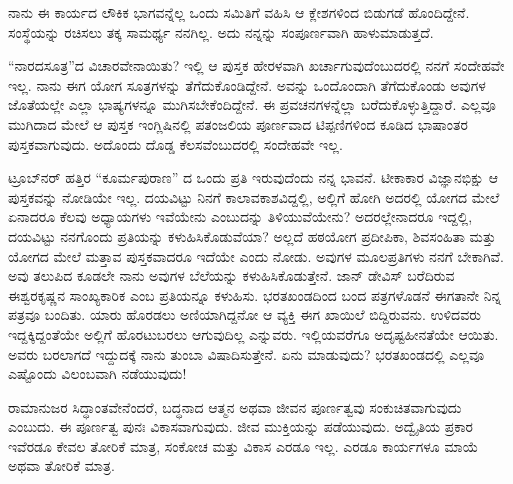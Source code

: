 ನಾನು ಈ ಕಾರ್ಯದ ಲೌಕಿಕ ಭಾಗವನ್ನೆಲ್ಲ ಒಂದು ಸಮಿತಿಗೆ ವಹಿಸಿ ಆ ಕ್ಲೇಶಗಳಿಂದ ಬಿಡುಗಡೆ ಹೊಂದಿದ್ದೇನೆ. ಸಂಸ್ಥೆಯನ್ನು ರಚಿಸಲು ತಕ್ಕ ಸಾಮರ್ಥ್ಯ ನನಗಿಲ್ಲ. ಅದು ನನ್ನನ್ನು ಸಂಪೂರ್ಣವಾಗಿ ಹಾಳುಮಾಡುತ್ತದೆ.

“ನಾರದಸೂತ್ರ”ದ ವಿಚಾರವೇನಾಯಿತು? ಇಲ್ಲಿ ಆ ಪುಸ್ತಕ ಹೇರಳವಾಗಿ ಖರ್ಚಾಗುವುದೆಂಬುದರಲ್ಲಿ ನನಗೆ ಸಂದೇಹವೇ ಇಲ್ಲ. ನಾನು ಈಗ ಯೋಗ ಸೂತ್ರಗಳನ್ನು ತೆಗೆದುಕೊಂಡಿದ್ದೇನೆ. ಅವನ್ನು ಒಂದೊಂದಾಗಿ ತೆಗೆದುಕೊಂಡು ಅವುಗಳ ಜೊತೆಯಲ್ಲೇ ಎಲ್ಲಾ ಭಾಷ್ಯಗಳನ್ನೂ ಮುಗಿಸಬೇಕೆಂದಿದ್ದೇನೆ. ಈ ಪ್ರವಚನಗಳನ್ನೆಲ್ಲಾ ಬರೆದುಕೊಳ್ಳುತ್ತಿದ್ದಾರೆ. ಎಲ್ಲವೂ ಮುಗಿದಾದ ಮೇಲೆ ಆ ಪುಸ್ತಕ ಇಂಗ್ಲಿಷಿನಲ್ಲಿ ಪತಂಜಲಿಯ ಪೂರ್ಣವಾದ ಟಿಪ್ಪಣಿಗಳಿಂದ ಕೂಡಿದ ಭಾಷಾಂತರ ಪುಸ್ತಕವಾಗುವುದು. ಅದೊಂದು ದೊಡ್ಡ ಕೆಲಸವೆಂಬುದರಲ್ಲಿ ಸಂದೇಹವೇ ಇಲ್ಲ.
\vspace{0.1cm}

ಟ್ರೂಬ್‌ನರ್‌ ಹತ್ತಿರ “ಕೂರ್ಮಪುರಾಣ” ದ ಒಂದು ಪ್ರತಿ ಇರುವುದೆಂದು ನನ್ನ ಭಾವನೆ. ಟೀಕಾಕಾರ ವಿಜ್ಞಾನಭಿಕ್ಷು ಆ ಪುಸ್ತಕವನ್ನು ನೋಡಿಯೇ ಇಲ್ಲ. ದಯವಿಟ್ಟು ನಿನಗೆ ಕಾಲಾವಕಾಶವಿದ್ದಲ್ಲಿ, ಅಲ್ಲಿಗೆ ಹೋಗಿ ಅದರಲ್ಲಿ ಯೋಗದ ಮೇಲೆ ಏನಾದರೂ ಕೆಲವು ಅಧ್ಯಾಯಗಳು ಇವೆಯೇನು ಎಂಬುದನ್ನು ತಿಳಿಯುವೆಯೇನು? ಅದರಲ್ಲೇನಾದರೂ ಇದ್ದಲ್ಲಿ, ದಯವಿಟ್ಟು ನನಗೊಂದು ಪ್ರತಿಯನ್ನು ಕಳುಹಿಸಿಕೊಡುವೆಯಾ? ಅಲ್ಲದೆ ಹಠಯೋಗ ಪ್ರದೀಪಿಕಾ, ಶಿವಸಂಹಿತಾ ಮತ್ತು ಯೋಗದ ಮೇಲೆ ಮತ್ತಾವ ಪುಸ್ತಕವಾದರೂ ಇದೆಯೇ ಎಂದು ನೋಡು. ಅವುಗಳ ಮೂಲಪ್ರತಿಗಳು ನನಗೆ ಬೇಕಾಗಿವೆ. ಅವು ತಲುಪಿದ ಕೂಡಲೇ ನಾನು ಅವುಗಳ ಬೆಲೆಯನ್ನು ಕಳುಹಿಸಿಕೊಡುತ್ತೇನೆ. ಜಾನ್ ಡೇವಿಸ್‌ ಬರೆದಿರುವ ಈಶ್ವರಕೃಷ್ಣನ ಸಾಂಖ್ಯಕಾರಿಕ ಎಂಬ ಪ್ರತಿಯನ್ನೂ ಕಳುಹಿಸು. ಭರತಖಂಡದಿಂದ ಬಂದ ಪತ್ರಗಳೊಡನೆ ಈಗತಾನೇ ನಿನ್ನ ಪತ್ರವೂ ಬಂದಿತು. ಯಾರು ಹೊರಡಲು ಅಣಿಯಾಗಿದ್ದನೋ ಆ ವ್ಯಕ್ತಿ ಈಗ ಖಾಯಿಲೆ ಬಿದ್ದಿರುವನು. ಉಳಿದವರು ಇದ್ದಕ್ಕಿದ್ದಂತೆಯೇ ಅಲ್ಲಿಗೆ ಹೊರಟುಬರಲು ಆಗುವುದಿಲ್ಲ ಎನ್ನುವರು. ಇಲ್ಲಿಯವರೆಗೂ ಅದೃಷ್ಟಹೀನತೆಯೇ ಆಯಿತು. ಅವರು ಬರಲಾಗದೆ ಇದ್ದುದಕ್ಕೆ ನಾನು ತುಂಬಾ ವಿಷಾದಿಸುತ್ತೇನೆ. ಏನು ಮಾಡುವುದು? ಭರತಖಂಡದಲ್ಲಿ ಎಲ್ಲವೂ ಎಷ್ಟೊಂದು ವಿಲಂಬವಾಗಿ ನಡೆಯುವುದು!
\vspace{0.1cm}

ರಾಮಾನುಜರ ಸಿದ್ಧಾಂತವೇನೆಂದರೆ, ಬದ್ಧನಾದ ಆತ್ಮನ ಅಥವಾ ಜೀವನ ಪೂರ್ಣತ್ವವು ಸಂಕುಚಿತವಾಗುವುದು ಎಂಬುದು. ಈ ಪೂರ್ಣತ್ವ ಪುನಃ ವಿಕಾಸವಾಗುವುದು. ಜೀವ ಮುಕ್ತಿಯನ್ನು ಪಡೆಯುವುದು. ಅದ್ವೈತಿಯ ಪ್ರಕಾರ ಇವೆರಡೂ ಕೇವಲ ತೋರಿಕೆ ಮಾತ್ರ, ಸಂಕೋಚ ಮತ್ತು ವಿಕಾಸ ಎರಡೂ ಇಲ್ಲ. ಎರಡೂ ಕಾರ್ಯಗಳೂ ಮಾಯೆ ಅಥವಾ ತೋರಿಕೆ ಮಾತ್ರ.
\vspace{0.1cm}

